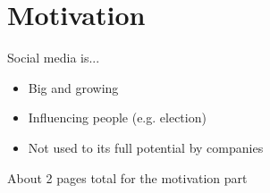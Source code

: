 
\chapter{Motivation}

\label{ch:motivation}

Social media is...

\begin{itemize}
    \item
    Big and growing
    \item
    Influencing people (e.g. election)
    \item
    Not used to its full potential by companies
\end{itemize}

About 2 pages total for the motivation part

\pagebreak[2]